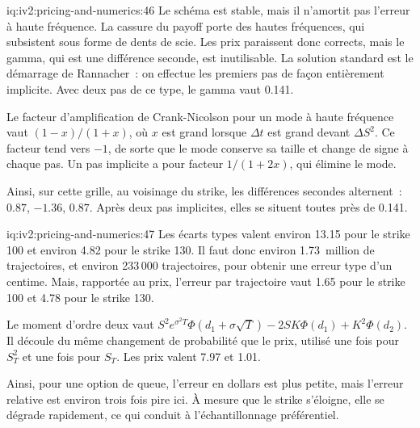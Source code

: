 \begin{solution}{iq:iv2:pricing-and-numerics:46}
Le schéma est stable, mais il n'amortit pas l'erreur à haute fréquence. La cassure du payoff porte des hautes fréquences, qui subsistent sous forme de dents de scie. Les prix paraissent donc corrects, mais le gamma, qui est une différence seconde, est inutilisable. La solution standard est le démarrage de Rannacher~: on effectue les premiers pas de façon entièrement implicite. Avec deux pas de ce type, le gamma vaut 0.141.

Le facteur d'amplification de Crank-Nicolson pour un mode à haute fréquence vaut $(1 - x)/(1 + x)$, où $x$ est grand lorsque $\Delta t$ est grand devant $\Delta S^2$. Ce facteur tend vers $-1$, de sorte que le mode conserve sa taille et change de signe à chaque pas. Un pas implicite a pour facteur $1/(1 + 2x)$, qui élimine le mode.

Ainsi, sur cette grille, au voisinage du strike, les différences secondes alternent~: $0.87$, $-1.36$, $0.87$. Après deux pas implicites, elles se situent toutes près de 0.141.

\end{solution}

\begin{solution}{iq:iv2:pricing-and-numerics:47}
Les écarts types valent environ 13.15 pour le strike 100 et environ 4.82 pour le strike 130. Il faut donc environ 1.73~million de trajectoires, et environ 233\,000 trajectoires, pour obtenir une erreur type d'un centime. Mais, rapportée au prix, l'erreur par trajectoire vaut 1.65 pour le strike 100 et 4.78 pour le strike 130.

Le moment d'ordre deux vaut $S^2e^{\sigma^2T}\Phi(d_1 + \sigma\sqrt T) - 2SK\Phi(d_1) + K^2\Phi(d_2)$. Il découle du même changement de probabilité que le prix, utilisé une fois pour $S_T^2$ et une fois pour $S_T$. Les prix valent 7.97 et 1.01.

Ainsi, pour une option de queue, l'erreur en dollars est plus petite, mais l'erreur relative est environ trois fois pire ici. À mesure que le strike s'éloigne, elle se dégrade rapidement, ce qui conduit à l'échantillonnage préférentiel.

\end{solution}

